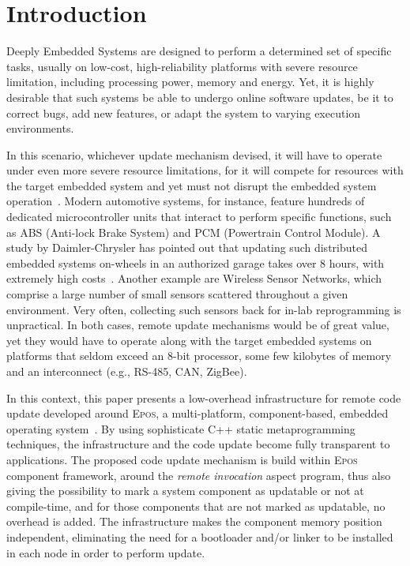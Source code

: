 \documentclass[10pt]{sigplanconf}
\newcommand{\epos}{\textsc{Epos}}
\begin{document}


\section{Introduction}
Deeply Embedded Systems are designed to perform a determined set of
specific tasks, usually on low-cost, high-reliability platforms with
severe resource limitation, including processing power, memory and
energy.  Yet, it is highly desirable that such systems be able to
undergo online software updates, be it to correct bugs,
add new features, or adapt the system to varying execution environments.

In this scenario, whichever update mechanism devised, it will have to
operate under even more severe resource limitations, for it will compete
for resources with the target embedded system and yet must not disrupt
the embedded system operation~\cite{update}. Modern automotive systems, for instance, feature
hundreds of dedicated microcontroller units that interact to perform
specific functions, such as ABS (Anti-lock Brake System) and PCM (Powertrain Control Module).
A study by Daimler-Chrysler has pointed
out that updating such distributed embedded systems on-wheels in an
authorized garage takes over 8 hours, with extremely high
costs~\cite{DC-2003}. Another example are Wireless Sensor Networks,
which comprise a large number of small sensors scattered throughout a
given environment. %
Very often, collecting such
sensors back for in-lab reprogramming is unpractical. In both cases,
remote update mechanisms would be of great value, yet they would have
to operate along with the target embedded systems on platforms that
seldom exceed an 8-bit processor, some few kilobytes of memory and
an interconnect (e.g., RS-485, CAN, ZigBee).

In this context, this paper presents a low-overhead infrastructure for
remote code update developed around \epos{}, a multi-platform,
component-based, embedded operating system~\cite{Froehlich:2001}. By 
using sophisticate C++ static metaprogramming techniques, the 
infrastructure and the code update become fully transparent to applications. 
The proposed code update mechanism is build within \epos{} component
framework, around the \emph{remote invocation} aspect program, thus
also giving the possibility to mark a system component as updatable or not at compile-time, 
and for those components that are not marked as updatable, no overhead is added.
The infrastructure makes the component memory position independent, eliminating 
the need for a bootloader and/or linker to be installed in each node in order to perform update.
\end{document}
